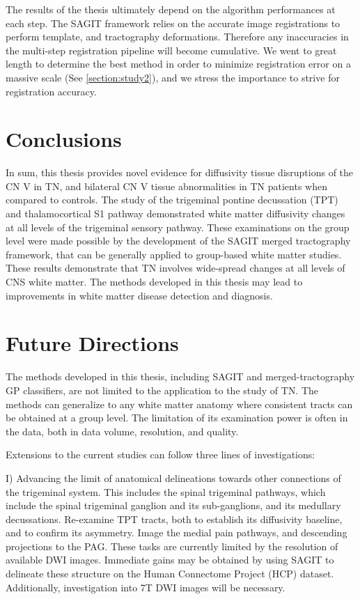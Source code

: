 The results of the thesis ultimately depend on the algorithm performances at each step. The SAGIT framework relies on the accurate image registrations to perform template, and tractography deformations. Therefore any inaccuracies in the multi-step registration pipeline will become cumulative. We went to great length to determine the best method in order to minimize registration error on a massive scale (See \ref{section:study2}), and we stress the importance to strive for registration accuracy. 

\chapter{Conclusions}

In sum, this thesis provides novel evidence for diffusivity tissue disruptions of the CN V in TN, and bilateral CN V tissue abnormalities in TN patients when compared to controls. The study of the trigeminal pontine decussation (TPT) and thalamocortical S1 pathway demonstrated white matter diffusivity changes at all levels of the trigeminal sensory pathway. These examinations on the group level were made possible by the development of the SAGIT merged tractography framework, that can be generally applied to group-based white matter studies. These results demonstrate that TN involves wide-spread changes at all levels of CNS white matter. The methods developed in this thesis may lead to improvements in white matter disease detection and diagnosis.


\chapter{Future Directions}

The methods developed in this thesis, including SAGIT and merged-tractography GP classifiers, are not limited to the application to the study of TN. The methods can generalize to any white matter anatomy where consistent tracts can be obtained at a group level. The limitation of its examination power is often in the data, both in data volume, resolution, and quality.

Extensions to the current studies can follow three lines of investigations:

I) Advancing the limit of anatomical delineations towards other connections of the trigeminal system. This includes the spinal trigeminal pathways, which include the spinal trigeminal ganglion and its sub-ganglions, and its medullary decussations. Re-examine TPT tracts, both to establish its diffusivity baseline, and to confirm its asymmetry. Image the medial pain pathways, and descending projections to the PAG. These tasks are currently limited by the resolution of available DWI images. Immediate gains may be obtained by using SAGIT to delineate these structure on the Human Connectome Project (HCP) dataset. Additionally, investigation into 7T DWI images will be necessary. 

